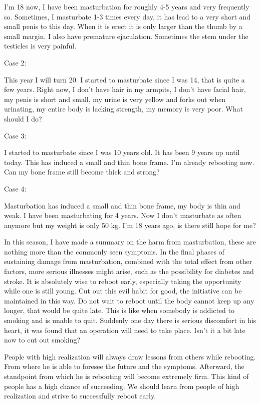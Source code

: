 \documentclass[
]{book}
\begin{document}
I'm 18 now, I have been masturbation for roughly 4-5 years and very frequently so. Sometimes, I masturbate 1-3 times every day, it has lead to a very short and small penis to this day. When it is erect it is only larger than the thumb by a small margin. I also have premature ejaculation. Sometimes the stem under the testicles is very painful.

Case 2:

This year I will turn 20. I started to masturbate since I was 14, that is quite a few years. Right now, I don't have hair in my armpits, I don't have facial hair, my penis is short and small, my urine is very yellow and forks out when urinating, my entire body is lacking strength, my memory is very poor. What should I do?

Case 3:

I started to masturbate since I was 10 years old. It has been 9 years up until today. This has induced a small and thin bone frame. I'm already rebooting now. Can my bone frame still become thick and strong?

Case 4:

Masturbation has induced a small and thin bone frame, my body is thin and weak. I have been masturbating for 4 years. Now I don't masturbate as often anymore but my weight is only 50 kg. I'm 18 years ago, is there still hope for me?

In this season, I have made a summary on the harm from masturbation, these are nothing more than the commonly seen symptoms. In the final phases of sustaining damage from masturbation, combined with the total effect from other factors, more serious illnesses might arise, such as the possibility for diabetes and stroke. It is absolutely wise to reboot early, especially taking the opportunity while one is still young. Cut out this evil habit for good, the initiative can be maintained in this way. Do not wait to reboot until the body cannot keep up any longer, that would be quite late. This is like when somebody is addicted to smoking and is unable to quit. Suddenly one day there is serious discomfort in his heart, it was found that an operation will need to take place. Isn't it a bit late now to cut out smoking?

People with high realization will always draw lessons from others while rebooting. From where he is able to foresee the future and the symptoms. Afterward, the standpoint from which he is rebooting will become extremely firm. This kind of people has a high chance of succeeding. We should learn from people of high realization and strive to successfully reboot early.
\end{document}
